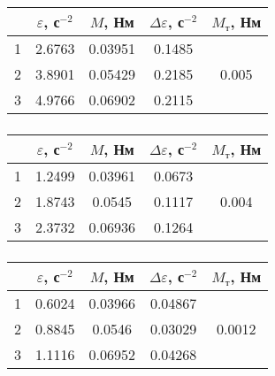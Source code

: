 \subsubsection*{}

\begin{tabular}{|c|c|c|c|c|}
	\hline
	\No & $\varepsilon$, с$^{-2}$ & $M$, Нм & $\Delta\varepsilon$, с$^{-2}$ & $M_\textrm{т}$, Нм\\
	\hline
	1 & 2.6763 & 0.03951 & 0.1485 &  \\
	\cline{1-4}
	2 & 3.8901 & 0.05429 & 0.2185 & 0.005\\
	\cline{1-4}
	3 & 4.9766 & 0.06902 & 0.2115 & \\
	\hline
\end{tabular}

\subsubsection*{}

\begin{tabular}{|c|c|c|c|c|}
	\hline
	\No & $\varepsilon$, с$^{-2}$ & $M$, Нм & $\Delta\varepsilon$, с$^{-2}$ & $M_\textrm{т}$, Нм\\
	\hline
	1 & 1.2499 & 0.03961 & 0.0673 & \\
	\cline{1-4}
	2 & 1.8743 & 0.0545 & 0.1117 & 0.004\\
	\cline{1-4}
	3 & 2.3732 & 0.06936 & 0.1264 & \\
	\hline
\end{tabular}

\subsubsection*{}

\begin{tabular}{|c|c|c|c|c|}
	\hline
	\No & $\varepsilon$, с$^{-2}$ & $M$, Нм & $\Delta\varepsilon$, с$^{-2}$ & $M_\textrm{т}$, Нм\\
	\hline
	1 & 0.6024 & 0.03966 & 0.04867 & \\
	\cline{1-4}
	2 & 0.8845 & 0.0546 & 0.03029 & 0.0012 \\
	\cline{1-4}
	3 & 1.1116 & 0.06952 & 0.04268 & \\
	\hline
\end{tabular}
